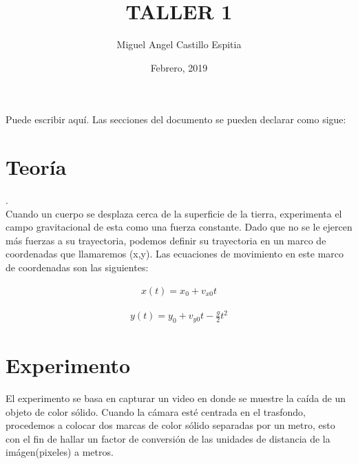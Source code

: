\documentclass[12pt]{article}
\begin{document}
\title{TALLER 1}
\author{Miguel Angel Castillo Espitia}
\date{Febrero, 2019}
\maketitle

Puede escribir aquí. Las secciones del documento se pueden declarar como sigue:

\section{Teoría}
.\\
Cuando un cuerpo se desplaza cerca de la superficie de la tierra, experimenta el campo gravitacional de esta como una fuerza constante. Dado que no se le ejercen más fuerzas a su trayectoria, podemos definir su trayectoria en un marco de coordenadas que llamaremos (x,y). Las ecuaciones de movimiento en este marco de coordenadas son las siguientes:\



\begin{equation}
  \begin{aligned}
	  {x(t)}={x}_{0}+{v}_{x0}{t}
	  \label{eq1}
  \end{aligned}
\end{equation}

\begin{equation}
  \begin{gathered}
	  {y(t)}={y}_{0}+{v}_{y0}{t}-\frac{g}{2}{t^{2}}
	  \label{eq2}
  \end{gathered}
\end{equation}


  
\section{Experimento}

El experimento se basa en capturar un video en donde se muestre la caída de un objeto de color sólido. Cuando la cámara esté centrada en el trasfondo, procedemos a colocar dos marcas de color sólido separadas por un metro, esto con el fin de hallar un factor de conversión de las unidades de distancia de la imágen(pixeles) a metros.
\end{document}
